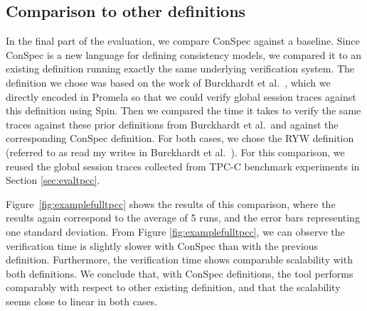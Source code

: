 \documentclass[journal,compsoc]{IEEEtran}
\begin{document}
\subsection{Comparison to other definitions}\label{sec:evalcompar}


In the final part of the evaluation, we compare ConSpec against a baseline. Since ConSpec is a new language for defining consistency models, we compared it to an existing definition running exactly the same underlying verification system. The definition we chose was based on the work of Burckhardt et al.~\cite{Burckhardt:2014:PEC:2693641.2693642}, which we directly encoded in Promela so that we could verify global session traces against this definition using Spin.  Then we compared the time it takes to verify the same traces against these prior definitions from Burckhardt et al.\ and against the corresponding ConSpec definition. For both cases, we chose the RYW definition (referred to as read my writes in Burckhardt et al.~\cite{Burckhardt:2014:PEC:2693641.2693642}). %
 For this comparison, we reused the global session traces collected from TPC-C benchmark experiments in Section \ref{sec:evaltpcc}.

Figure~\ref{fig:examplefulltpcc} shows the results of this comparison, where the results again correspond to the average of 5 runs, and the error bars representing one standard deviation. From Figure \ref{fig:examplefulltpcc}, we can observe the verification time is slightly slower with ConSpec than with the previous definition. Furthermore, the verification time shows comparable scalability with both definitions. %
 We conclude that, with ConSpec definitions, the tool performs comparably with respect to other existing definition, and that the scalability seems close to linear in both cases.
\end{document}
